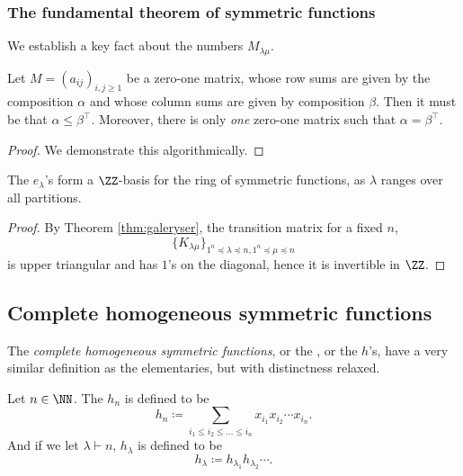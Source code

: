 \documentclass{article}
\begin{document}
\subsubsection{The fundamental theorem of symmetric functions}

We establish a key fact about the numbers $M_{\lambda\mu}$.
\begin{theorem} \label{thm:galeryser} Let $M = (a_{ij})_{i,j \geq 1}$ be a zero-one matrix, whose row sums are given by the composition $\alpha$ and whose column sums are given by composition $\beta$. Then it must be that $\alpha \leq \beta^\top$. Moreover, there is only \textit{one} zero-one matrix such that $\alpha = \beta^\top$.
\end{theorem}

\begin{proof}
    We demonstrate this algorithmically. 
    
\end{proof}

\begin{theorem}
    The $e_\lambda$'s form a $\ZZ$-basis for the ring of symmetric functions, as $\lambda$ ranges over all partitions.
\end{theorem}

\begin{proof}
    By Theorem \ref{thm:galeryser}, the transition matrix for a fixed $n$,
    \[
        \{K_{\lambda\mu}\}_{1^n \preceq \lambda \preceq n, 1^n \preceq \mu \preceq n}
    \]
    is upper triangular and has $1$'s on the diagonal, hence it is invertible in $\ZZ$. 
\end{proof}

\subsection{Complete homogeneous symmetric functions}

The \textit{complete homogeneous symmetric functions}, or the , or the $h$'s, have a very similar definition as the elementaries, but with distinctness relaxed.

\begin{definition}
    Let $n\in\NN$. The  $h_n$ is defined to be
    \[
        h_n \coloneq \sum_{i_1\leq i_2\leq\ldots\leq i_n} x_{i_1}x_{i_2}\cdots x_{i_n}.
    \]
    And if we let $\lambda \vdash n$, $h_\lambda$ is defined to be
    \[
        h_\lambda \coloneq h_{\lambda_1}h_{\lambda_2}\cdots.
    \]
\end{definition}
\end{document}
